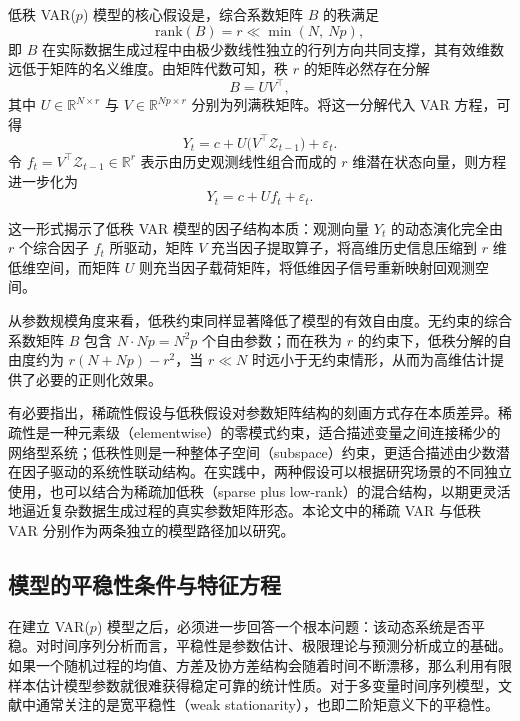 低秩 VAR($p$) 模型的核心假设是，综合系数矩阵 $B$ 的秩满足
\begin{equation}
\mathrm{rank}(B) = r \ll \min(N,\ Np),
\end{equation}
即 $B$ 在实际数据生成过程中由极少数线性独立的行列方向共同支撑，其有效维数远低于矩阵的名义维度。由矩阵代数可知，秩 $r$ 的矩阵必然存在分解
\begin{equation}
B = U V^\top,
\end{equation}
其中 $U\in\mathbb{R}^{N\times r}$ 与 $V\in\mathbb{R}^{Np\times r}$ 分别为列满秩矩阵。将这一分解代入 VAR 方程，可得
\begin{equation}
Y_t = c + U\bigl(V^\top\mathcal{Z}_{t-1}\bigr) + \varepsilon_t.
\end{equation}
令 $f_t = V^\top\mathcal{Z}_{t-1}\in\mathbb{R}^r$ 表示由历史观测线性组合而成的 $r$ 维潜在状态向量，则方程进一步化为
\begin{equation}
Y_t = c + U f_t + \varepsilon_t.
\end{equation}

这一形式揭示了低秩 VAR 模型的因子结构本质：观测向量 $Y_t$ 的动态演化完全由 $r$ 个综合因子 $f_t$ 所驱动，矩阵 $V$ 充当因子提取算子，将高维历史信息压缩到 $r$ 维低维空间，而矩阵 $U$ 则充当因子载荷矩阵，将低维因子信号重新映射回观测空间。

从参数规模角度来看，低秩约束同样显著降低了模型的有效自由度。无约束的综合系数矩阵 $B$ 包含 $N\cdot Np=N^2p$ 个自由参数；而在秩为 $r$ 的约束下，低秩分解的自由度约为 $r(N+Np)-r^2$，当 $r\ll N$ 时远小于无约束情形，从而为高维估计提供了必要的正则化效果。

有必要指出，稀疏性假设与低秩假设对参数矩阵结构的刻画方式存在本质差异。稀疏性是一种元素级（elementwise）的零模式约束，适合描述变量之间连接稀少的网络型系统；低秩性则是一种整体子空间（subspace）约束，更适合描述由少数潜在因子驱动的系统性联动结构。在实践中，两种假设可以根据研究场景的不同独立使用，也可以结合为稀疏加低秩（sparse plus low-rank）的混合结构，以期更灵活地逼近复杂数据生成过程的真实参数矩阵形态。本论文中的稀疏 VAR 与低秩 VAR 分别作为两条独立的模型路径加以研究。

\subsection{模型的平稳性条件与特征方程}

在建立 VAR($p$) 模型之后，必须进一步回答一个根本问题：该动态系统是否平稳。对时间序列分析而言，平稳性是参数估计、极限理论与预测分析成立的基础。如果一个随机过程的均值、方差及协方差结构会随着时间不断漂移，那么利用有限样本估计模型参数就很难获得稳定可靠的统计性质。对于多变量时间序列模型，文献中通常关注的是宽平稳性（weak stationarity），也即二阶矩意义下的平稳性。

